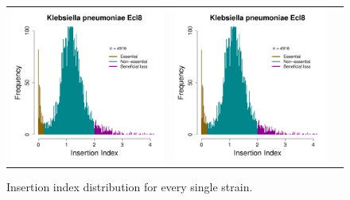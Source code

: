 \documentclass[a4paper,10pt, twocolumn]{article}
\begin{document}
\begin{figure}
\begin{tabular}{c c c}
\includegraphics[page=11, scale=0.28]{per-species-insertion-index.pdf} &
\includegraphics[page=12, scale=0.28]{per-species-insertion-index.pdf} \\
\end{tabular}
\caption{Insertion index distribution for every single strain.}
\label{fig:ii-singlestrain}
\end{figure}
\end{document}
